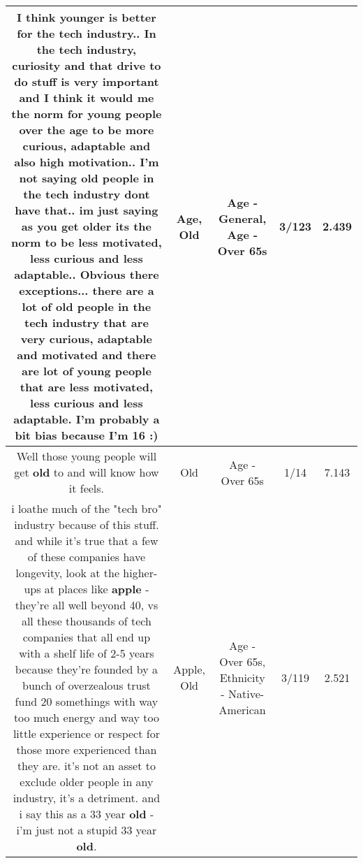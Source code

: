 \documentclass[11pt]{article}
\newlength\mylength
\begin{document}
\begin{center}
\begin{longtable}{|C{.65\mylength}|C{.30\mylength}|C{.12\mylength}|C{.12\mylength}|C{.12\mylength}|}
  \small I think younger is better for the tech industry.. In the tech industry, curiosity and that drive to do stuff is very important and I think it would me the norm for young people over the \textbf{age} to be more curious, adaptable and also high motivation.. I'm not saying \textbf{old} people in the tech industry dont have that.. im just saying as you get older its the norm to be less motivated, less curious and less adaptable.. Obvious there exceptions... there are a lot of \textbf{old} people in the tech industry that are very curious, adaptable and motivated and there are lot of young people that are less motivated, less curious and less adaptable. I'm probably a bit bias because I'm 16 :)\normalsize   & Age, Old & Age - General, Age - Over 65s & 3/123 & 2.439 \\  \hline
  \small Well those young people will get \textbf{old} to and will know how it feels.\normalsize   & Old & Age - Over 65s & 1/14 & 7.143 \\  \hline
  \small i loathe much of the "tech bro" industry because of this stuff. and while it's true that a few of these companies have longevity, look at the higher-ups at places like \textbf{apple} - they're all well beyond 40, vs all these thousands of tech companies that all end up with a shelf life of 2-5 years because they're founded by a bunch of overzealous trust fund 20 somethings with way too much energy and way too little experience or respect for those more experienced than they are. it's not an asset to exclude older people in any industry, it's a detriment. and i say this as a 33 year \textbf{old} - i'm just not a stupid 33 year \textbf{old}.\normalsize   & Apple, Old & Age - Over 65s, Ethnicity - Native-American & 3/119 & 2.521 \\  \hline

\end{longtable}
\end{center}
\end{document}
